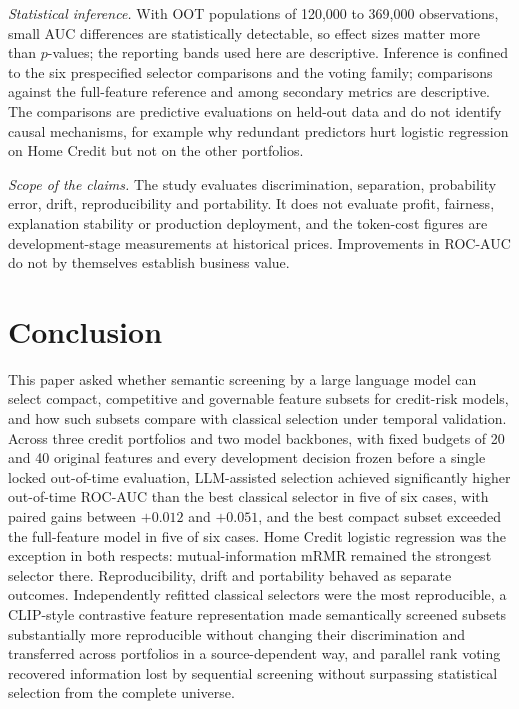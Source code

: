 \documentclass[preprint,12pt]{elsarticle}
\begin{document}
\emph{Statistical inference.} With OOT populations of 120,000 to 369,000 observations, small AUC differences are statistically detectable, so effect sizes matter more than $p$-values; the reporting bands used here are descriptive. Inference is confined to the six prespecified selector comparisons and the voting family; comparisons against the full-feature reference and among secondary metrics are descriptive. The comparisons are predictive evaluations on held-out data and do not identify causal mechanisms, for example why redundant predictors hurt logistic regression on Home Credit but not on the other portfolios.

\emph{Scope of the claims.} The study evaluates discrimination, separation, probability error, drift, reproducibility and portability. It does not evaluate profit, fairness, explanation stability or production deployment, and the token-cost figures are development-stage measurements at historical prices. Improvements in ROC-AUC do not by themselves establish business value.


\section{Conclusion}
\label{sec:conclusion}

This paper asked whether semantic screening by a large language model can select compact, competitive and governable feature subsets for credit-risk models, and how such subsets compare with classical selection under temporal validation. Across three credit portfolios and two model backbones, with fixed budgets of 20 and 40 original features and every development decision frozen before a single locked out-of-time evaluation, LLM-assisted selection achieved significantly higher out-of-time ROC-AUC than the best classical selector in five of six cases, with paired gains between $+0.012$ and $+0.051$, and the best compact subset exceeded the full-feature model in five of six cases. Home Credit logistic regression was the exception in both respects: mutual-information mRMR remained the strongest selector there. Reproducibility, drift and portability behaved as separate outcomes. Independently refitted classical selectors were the most reproducible, a CLIP-style contrastive feature representation made semantically screened subsets substantially more reproducible without changing their discrimination and transferred across portfolios in a source-dependent way, and parallel rank voting recovered information lost by sequential screening without surpassing statistical selection from the complete universe.
\end{document}
